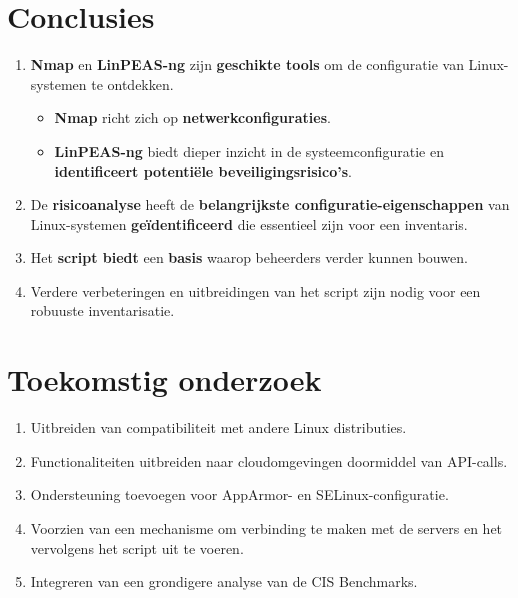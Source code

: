 \documentclass[a0,portrait]{hogent-poster}
\begin{document}
\begin{multicols}{2}
\section{Conclusies}

\begin{enumerate}
  \item \textbf{Nmap} en \textbf{LinPEAS-ng} zijn \textbf{geschikte tools} om de configuratie van Linux-systemen te ontdekken.
    \begin{itemize}
      \item \textbf{Nmap} richt zich op \textbf{netwerkconfiguraties}.
      \item \textbf{LinPEAS-ng} biedt dieper inzicht in de systeemconfiguratie en \textbf{identificeert potenti\"ele beveiligingsrisico's}.
    \end{itemize}
  \item De \textbf{risicoanalyse} heeft de \textbf{belangrijkste configuratie-eigenschappen} van Linux-systemen \textbf{ge\"identificeerd} die essentieel zijn voor een inventaris.
  \item Het \textbf{script biedt} een \textbf{basis} waarop beheerders verder kunnen bouwen.
  \item Verdere verbeteringen en uitbreidingen van het script zijn nodig voor een robuuste inventarisatie.
\end{enumerate}

\section{Toekomstig onderzoek}

\begin{enumerate}
  \item Uitbreiden van compatibiliteit met andere Linux distributies.
  \item Functionaliteiten uitbreiden naar cloudomgevingen doormiddel van API-calls.
  \item Ondersteuning toevoegen voor AppArmor- en SELinux-configuratie.
  \item Voorzien van een mechanisme om verbinding te maken met de servers en het vervolgens het script uit te voeren.
  \item Integreren van een grondigere analyse van de CIS Benchmarks.
\end{enumerate}

\end{multicols}
\end{document}
